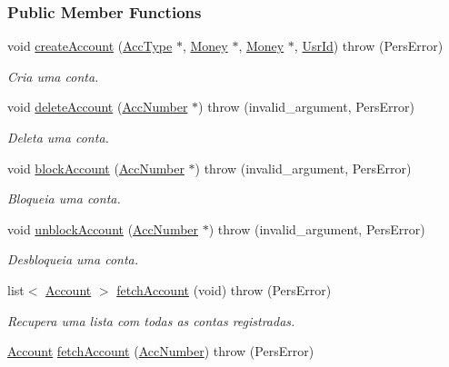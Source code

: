 \subsubsection*{Public Member Functions}
\begin{DoxyCompactItemize}
\item 
void \hyperlink{classCtrlUserAccAdm_aa08ff58074dc0cb37c4d878e04b34adc}{create\-Account} (\hyperlink{classUsrType}{Acc\-Type} $\ast$, \hyperlink{classMoney}{Money} $\ast$, \hyperlink{classMoney}{Money} $\ast$, \hyperlink{classUsrId}{Usr\-Id})  throw (\-Pers\-Error)
\begin{DoxyCompactList}\small\item\em Cria uma conta. \end{DoxyCompactList}\item 
void \hyperlink{classCtrlUserAccAdm_aff45f0827b96208a4ccd6ae22610c5e3}{delete\-Account} (\hyperlink{classAccNumber}{Acc\-Number} $\ast$)  throw (invalid\-\_\-argument, Pers\-Error)
\begin{DoxyCompactList}\small\item\em Deleta uma conta. \end{DoxyCompactList}\item 
void \hyperlink{classCtrlUserAccAdm_a31433e164de26c03becbc04f57c029ea}{block\-Account} (\hyperlink{classAccNumber}{Acc\-Number} $\ast$)  throw (invalid\-\_\-argument, Pers\-Error)
\begin{DoxyCompactList}\small\item\em Bloqueia uma conta. \end{DoxyCompactList}\item 
void \hyperlink{classCtrlUserAccAdm_ad129cb69fc2a73cfb40bd52063d4369e}{unblock\-Account} (\hyperlink{classAccNumber}{Acc\-Number} $\ast$)  throw (invalid\-\_\-argument, Pers\-Error)
\begin{DoxyCompactList}\small\item\em Desbloqueia uma conta. \end{DoxyCompactList}\item 
list$<$ \hyperlink{classAccount}{Account} $>$ \hyperlink{classCtrlUserAccAdm_a42e34f0780b86f393c25010e693450c2}{fetch\-Account} (void)  throw (\-Pers\-Error)
\begin{DoxyCompactList}\small\item\em Recupera uma lista com todas as contas registradas. \end{DoxyCompactList}\item 
\hyperlink{classAccount}{Account} \hyperlink{classCtrlUserAccAdm_a94e2637bedec766614095eee44bc9f38}{fetch\-Account} (\hyperlink{classAccNumber}{Acc\-Number})  throw (\-Pers\-Error)

\end{DoxyCompactItemize}
